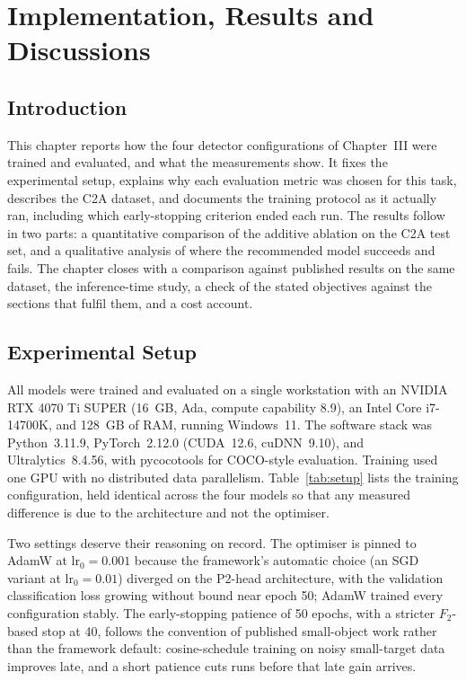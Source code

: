 \chapter{Implementation, Results and Discussions}

\section{Introduction}
This chapter reports how the four detector configurations of Chapter~III were
trained and evaluated, and what the measurements show. It fixes the experimental
setup, explains why each evaluation metric was chosen for this task, describes
the C2A dataset, and documents the training protocol as it actually ran,
including which early-stopping criterion ended each run. The results follow in
two parts: a quantitative comparison of the additive ablation on the C2A test
set, and a qualitative analysis of where the recommended model succeeds and
fails. The chapter closes with a comparison against published results on the
same dataset, the inference-time study, a check of the stated objectives
against the sections that fulfil them, and a cost account.

\section{Experimental Setup}
\label{sec:setup}
All models were trained and evaluated on a single workstation with an NVIDIA
RTX 4070 Ti SUPER (16~GB, Ada, compute capability 8.9), an Intel Core
i7-14700K, and 128~GB of RAM, running Windows~11. The software stack was
Python~3.11.9, PyTorch~2.12.0 (CUDA~12.6, cuDNN~9.10), and Ultralytics~8.4.56,
with pycocotools for COCO-style evaluation. Training used one GPU with no
distributed data parallelism. Table~\ref{tab:setup} lists the training
configuration, held identical across the four models so that any measured
difference is due to the architecture and not the optimiser.

Two settings deserve their reasoning on record. The optimiser is pinned to
AdamW at $\text{lr}_0 = 0.001$ because the framework's automatic choice
(an SGD variant at $\text{lr}_0 = 0.01$) diverged on the P2-head
architecture, with the validation classification loss growing without bound
near epoch 50; AdamW trained every configuration stably. The early-stopping
patience of 50 epochs, with a stricter $F_2$-based stop at 40, follows the
convention of published small-object work rather than the framework default:
cosine-schedule training on noisy small-target data improves late, and a short
patience cuts runs before that late gain arrives.

